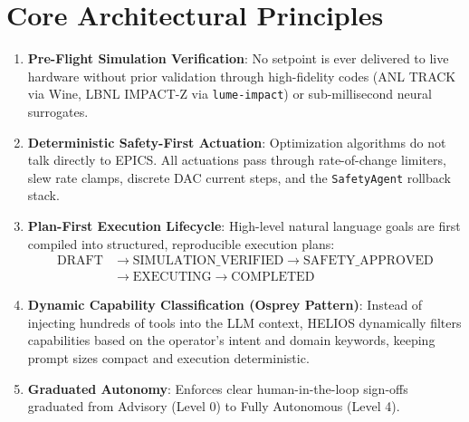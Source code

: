 \documentclass[11pt,a4paper]{report}
\begin{document}
\section{Core Architectural Principles}
\begin{enumerate}
    \item \textbf{Pre-Flight Simulation Verification}: No setpoint is ever delivered to live hardware without prior validation through high-fidelity codes (ANL TRACK via Wine, LBNL IMPACT-Z via \texttt{lume-impact}) or sub-millisecond neural surrogates.
    \item \textbf{Deterministic Safety-First Actuation}: Optimization algorithms do not talk directly to EPICS. All actuations pass through rate-of-change limiters, slew rate clamps, discrete DAC current steps, and the \texttt{SafetyAgent} rollback stack.
    \item \textbf{Plan-First Execution Lifecycle}: High-level natural language goals are first compiled into structured, reproducible execution plans:
    \begin{equation*}
    \begin{aligned}
    \text{DRAFT} &\longrightarrow \text{SIMULATION\_VERIFIED} \longrightarrow \text{SAFETY\_APPROVED} \\
    &\longrightarrow \text{EXECUTING} \longrightarrow \text{COMPLETED}
    \end{aligned}
    \end{equation*}
    \item \textbf{Dynamic Capability Classification (Osprey Pattern)}: Instead of injecting hundreds of tools into the LLM context, HELIOS dynamically filters capabilities based on the operator's intent and domain keywords, keeping prompt sizes compact and execution deterministic.
    \item \textbf{Graduated Autonomy}: Enforces clear human-in-the-loop sign-offs graduated from Advisory (Level 0) to Fully Autonomous (Level 4).
\end{enumerate}
\end{document}
